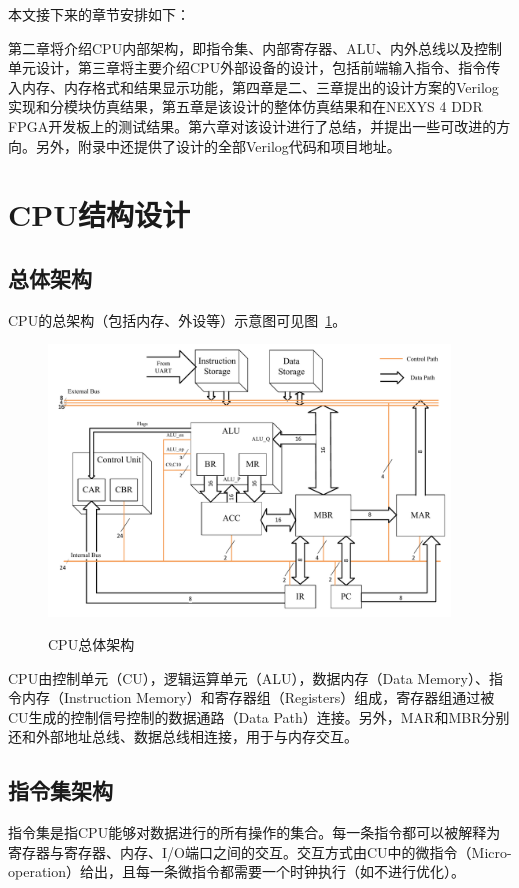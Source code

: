 \documentclass[lang=cn,a4paper,newtx]{elegantpaper}
\begin{document}
本文接下来的章节安排如下：

第二章将介绍CPU内部架构，即指令集、内部寄存器、ALU、内外总线以及控制单元设计，第三章将主要介绍CPU外部设备的设计，包括前端输入指令、指令传入内存、内存格式和结果显示功能，第四章是二、三章提出的设计方案的Verilog实现和分模块仿真结果，第五章是该设计的整体仿真结果和在NEXYS 4 DDR FPGA开发板上的测试结果。第六章对该设计进行了总结，并提出一些可改进的方向。另外，附录中还提供了设计的全部Verilog代码和项目地址。

\section{CPU结构设计}
\subsection{总体架构}

CPU的总架构（包括内存、外设等）示意图可见图~\ref{fig:CPU}。
\begin{figure}[htbp]
  \centering
  \caption{CPU总体架构}
  \includegraphics[width = 0.95\textwidth]{figure/CPU_structure.pdf}
  \label{fig:CPU}
\end{figure}

CPU由控制单元（CU），逻辑运算单元（ALU），数据内存（Data Memory）、指令内存（Instruction Memory）和寄存器组（Registers）组成，寄存器组通过被CU生成的控制信号控制的数据通路（Data Path）连接。另外，MAR和MBR分别还和外部地址总线、数据总线相连接，用于与内存交互。



\subsection{指令集架构}
指令集是指CPU能够对数据进行的所有操作的集合。每一条指令都可以被解释为寄存器与寄存器、内存、I/O端口之间的交互。交互方式由CU中的微指令（Micro-operation）给出，且每一条微指令都需要一个时钟执行（如不进行优化）。
\end{document}
